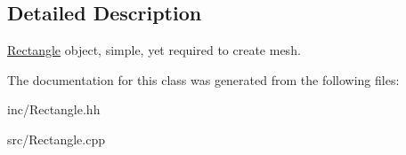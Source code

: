 \subsection{Detailed Description}
\hyperlink{class_rectangle}{Rectangle} object, simple, yet required to create mesh. 

The documentation for this class was generated from the following files\+:\begin{DoxyCompactItemize}
\item 
inc/Rectangle.\+hh\item 
src/Rectangle.\+cpp\end{DoxyCompactItemize}
